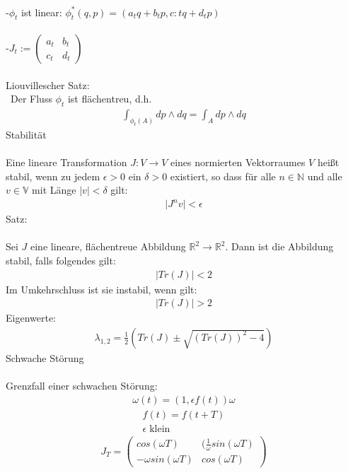 \documentclass[10pt,a4paper]{article}
\begin{document}
\\
-$ \phi_t $ ist linear: $ \phi_t^*(q,p)=(a_tq+b_tp, c:tq+d_tp) $ \\
\\
-$ J_t:= \begin{pmatrix} a_t & b_t \\ c_t & d_t \end{pmatrix} $\\
\\
Liouvillescher Satz: \\\
Der Fluss $ \phi_t$ ist flächentreu, d.h.
\begin{align}
\int_{\phi_t (A)} dp \wedge dq = \int_A dp \wedge dq
\end{align}
Stabilität \\
\\
Eine lineare Transformation $J:V \longrightarrow V$ eines normierten Vektorraumes $V$ heißt stabil, wenn zu jedem $\epsilon >0 $ ein $\delta>0$ existiert, so dass für alle $n \in \mathbb{N} $ und alle $v \in \mathbb{V}$ mit Länge $ \vert v \vert < \delta $ gilt:
\begin{align}
\vert J^nv\vert < \epsilon
\end{align}
Satz:\\
\\
Sei $J$ eine lineare, flächentreue Abbildung $ \mathbb{R}^2 \longrightarrow \mathbb{R}^2 $. Dann ist die Abbildung stabil, falls folgendes gilt:
\begin{align}
\vert Tr(J)\vert <2
\end{align}
Im Umkehrschluss ist sie instabil, wenn gilt:
\begin{align}
\vert Tr(J)\vert >2
\end{align}
Eigenwerte:
\begin{align}
\lambda_{1,2} = \frac{1}{2}(Tr(J) \pm \sqrt{(Tr(J))^2-4})
\end{align}
Schwache Störung\\
\\
Grenzfall einer schwachen Störung:
\begin{align}
\omega(t)=(1,\epsilon f(t)) \omega
\end{align}
\begin{align}
f(t)=f(t+T)\\
\epsilon \; \text{klein}
\end{align}
\begin{align}
J_T=\begin{pmatrix}
	cos(\omega T) & (\frac{1}{\omega} sin(\omega T) \\ -\omega sin(\omega T) & cos(\omega T) 
\end{pmatrix}
\end{align}
\end{document}
